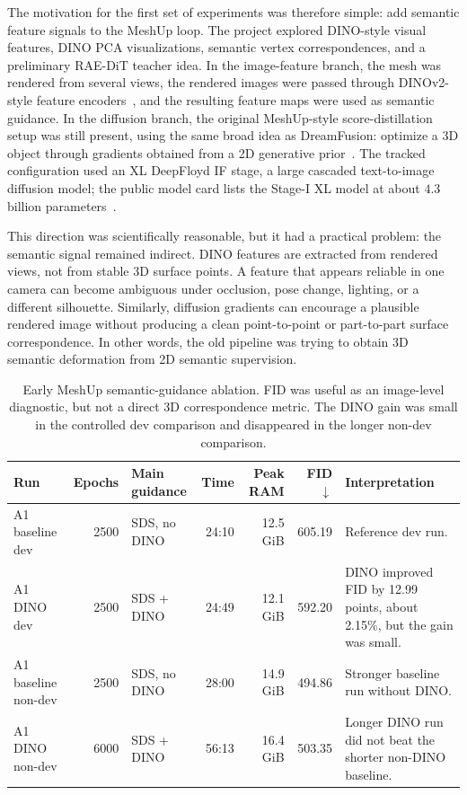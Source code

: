 \documentclass{article}
\begin{document}
The motivation for the first set of experiments was therefore simple: add semantic feature signals
to the MeshUp loop. The project explored DINO-style visual features, DINO PCA visualizations,
semantic vertex correspondences, and a preliminary RAE-DiT teacher idea. In the image-feature
branch, the mesh was rendered from several views, the rendered images were passed through
DINOv2-style feature encoders~\cite{dinov2}, and the resulting feature maps were used as semantic
guidance. In the diffusion branch, the original MeshUp-style score-distillation setup was still
present, using the same broad idea as DreamFusion: optimize a 3D object through gradients obtained
from a 2D generative prior~\cite{dreamfusion}. The tracked configuration used an XL DeepFloyd IF
stage, a large cascaded text-to-image diffusion model; the public model card lists the Stage-I XL
model at about $4.3$ billion parameters~\cite{deepfloydif}.

This direction was scientifically reasonable, but it had a practical problem: the semantic signal
remained indirect. DINO features are extracted from rendered views, not from stable 3D surface
points. A feature that appears reliable in one camera can become ambiguous under occlusion, pose
change, lighting, or a different silhouette. Similarly, diffusion gradients can encourage a
plausible rendered image without producing a clean point-to-point or part-to-part surface
correspondence. In other words, the old pipeline was trying to obtain 3D semantic deformation from
2D semantic supervision.

\begin{table}[H]
\centering
\scriptsize
\begin{tabularx}{\textwidth}{>{\raggedright\arraybackslash}p{}r>{\raggedright\arraybackslash}p{}rrr>{\raggedright\arraybackslash}X}
\toprule
Run & Epochs & Main guidance & Time & Peak RAM & FID $\downarrow$ & Interpretation \\
\midrule
A1 baseline dev & 2500 & SDS, no DINO & 24:10 & 12.5 GiB & 605.19 &
Reference dev run. \\
A1 DINO dev & 2500 & SDS + DINO & 24:49 & 12.1 GiB & 592.20 &
DINO improved FID by 12.99 points, about 2.15\%, but the gain was small. \\
A1 baseline non-dev & 2500 & SDS, no DINO & 28:00 & 14.9 GiB & 494.86 &
Stronger baseline run without DINO. \\
A1 DINO non-dev & 6000 & SDS + DINO & 56:13 & 16.4 GiB & 503.35 &
Longer DINO run did not beat the shorter non-DINO baseline. \\
\bottomrule
\end{tabularx}
\caption{Early MeshUp semantic-guidance ablation. FID was useful as an image-level diagnostic, but
not a direct 3D correspondence metric. The DINO gain was small in the controlled dev comparison and
disappeared in the longer non-dev comparison.}
\label{tab:appendix-semantic-ablation}
\end{table}
\end{document}
